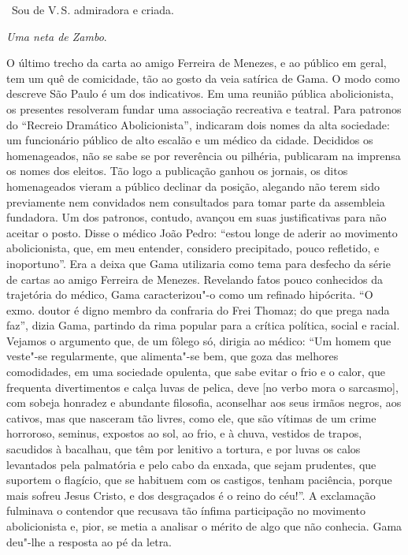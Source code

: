 \hfill\ Sou de V.\,S. admiradora e criada.

\hfill\emph{Uma neta de Zambo}.

\paginabranca
\mbox{}\vfill
\thispagestyle{empty}

{\small\noindent
O último trecho da carta ao amigo Ferreira de Menezes, e ao
público em geral, tem um quê de comicidade, tão ao gosto da veia
satírica de Gama. O modo como descreve São Paulo é um dos indicativos.
Em uma reunião pública abolicionista, os presentes
resolveram fundar uma associação recreativa e teatral. Para patronos do
``Recreio Dramático Abolicionista'', indicaram dois nomes da alta
sociedade: um funcionário público de alto escalão e um médico da cidade.
Decididos os homenageados, não se sabe se por reverência ou pilhéria,
publicaram na imprensa os nomes dos eleitos. Tão logo a publicação
ganhou os jornais, os ditos homenageados vieram a público declinar da
posição, alegando não terem sido previamente nem convidados nem
consultados para tomar parte da assembleia fundadora. Um dos patronos,
contudo, avançou em suas justificativas para não aceitar o posto. Disse
o médico João Pedro: ``estou longe de aderir ao movimento abolicionista,
que, em meu entender, considero precipitado, pouco refletido, e
inoportuno''. Era a deixa que Gama utilizaria como tema para desfecho da
série de cartas ao amigo Ferreira de Menezes. Revelando fatos pouco
conhecidos da trajetória do médico, Gama caracterizou"-o como um refinado hipócrita. ``O exmo.
doutor é digno membro da confraria do Frei Thomaz; do que prega nada
faz'', dizia Gama, partindo da rima popular para a crítica política,
social e racial. Vejamos o argumento que, de um fôlego só,
dirigia ao médico: ``Um homem que
veste"-se regularmente, que alimenta"-se bem, que goza das melhores
comodidades, em uma sociedade opulenta, que sabe evitar o frio e o
calor, que frequenta divertimentos e calça luvas de pelica, deve {[}no
verbo mora o sarcasmo{]}, com sobeja honradez e abundante filosofia,
aconselhar aos seus irmãos negros, aos cativos, mas que nasceram tão
livres, como ele, que são vítimas de um crime horroroso, seminus,
expostos ao sol, ao frio, e à chuva, vestidos de trapos, sacudidos à
bacalhau, que têm por lenitivo a tortura, e por luvas os calos
levantados pela palmatória e pelo cabo da enxada, que sejam prudentes,
que suportem o flagício, que se habituem com os castigos, tenham
paciência, porque mais sofreu Jesus Cristo, e dos desgraçados é o reino
do céu!''. A exclamação fulminava o contendor que recusava tão ínfima
participação no movimento abolicionista e, pior, se metia a analisar o
mérito de algo que não conhecia. Gama deu"-lhe a resposta ao pé da letra.}


